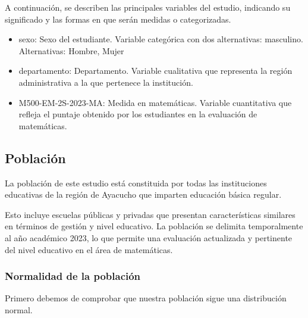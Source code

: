 \documentclass[
]{article}
\newenvironment{Shaded}{\begin{snugshade}}{\end{snugshade}}
\newcommand{\FunctionTok}[1]{\textcolor[rgb]{0.13,0.29,0.53}{\textbf{#1}}}
\newcommand{\NormalTok}[1]{#1}
\newcommand{\OtherTok}[1]{\textcolor[rgb]{0.56,0.35,0.01}{#1}}
\newcommand{\SpecialCharTok}[1]{\textcolor[rgb]{0.81,0.36,0.00}{\textbf{#1}}}
\newcommand{\StringTok}[1]{\textcolor[rgb]{0.31,0.60,0.02}{#1}}
\begin{document}
A continuación, se describen las principales variables del estudio,
indicando su significado y las formas en que serán medidas o
categorizadas.

\begin{itemize}
    \item sexo: Sexo del estudiante. Variable categórica con dos alternativas: masculino. Alternativas: Hombre, Mujer
    \item departamento: Departamento. Variable cualitativa que representa la región administrativa a la que pertenece la institución.
    \item M500-EM-2S-2023-MA: Medida en matemáticas. Variable cuantitativa que refleja el puntaje obtenido por los estudiantes en la evaluación de matemáticas.

\end{itemize}

\subsection*{Población}\label{poblaciuxf3n}

La población de este estudio está constituida por todas las
instituciones educativas de la región de Ayacucho que imparten educación
básica regular.

Esto incluye escuelas públicas y privadas que presentan características
similares en términos de gestión y nivel educativo. La población se
delimita temporalmente al año académico 2023, lo que permite una
evaluación actualizada y pertinente del nivel educativo en el área de
matemáticas.

\subsubsection*{Normalidad de la
población}\label{normalidad-de-la-poblaciuxf3n}

Primero debemos de comprobar que nuestra población sigue una
distribución normal.

\begin{Shaded}
\end{Shaded}
\end{document}
